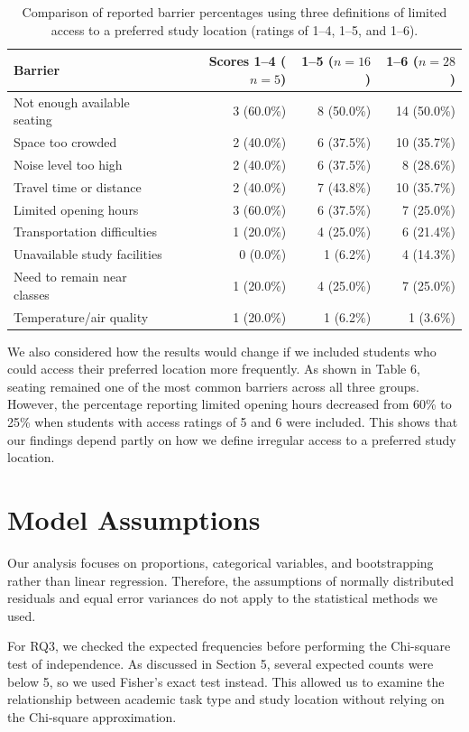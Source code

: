 \documentclass[11pt,letterpaper]{article}
\begin{document}
\begin{table}[H]\centering\small
\label{tab:sensitivity}
\begin{tabular}{@{}p{7cm}rrr@{}}\toprule
Barrier & Scores 1--4 ($n=5$) & 1--5 ($n=16$) & 1--6 ($n=28$)\\\midrule
Not enough available seating & 3 (60.0\%) & 8 (50.0\%) & 14 (50.0\%)\\
Space too crowded & 2 (40.0\%) & 6 (37.5\%) & 10 (35.7\%)\\
Noise level too high & 2 (40.0\%) & 6 (37.5\%) & 8 (28.6\%)\\
Travel time or distance & 2 (40.0\%) & 7 (43.8\%) & 10 (35.7\%)\\
Limited opening hours & 3 (60.0\%) & 6 (37.5\%) & 7 (25.0\%)\\
Transportation difficulties & 1 (20.0\%) & 4 (25.0\%) & 6 (21.4\%)\\
Unavailable study facilities & 0 (0.0\%) & 1 (6.2\%) & 4 (14.3\%)\\
Need to remain near classes & 1 (20.0\%) & 4 (25.0\%) & 7 (25.0\%)\\
Temperature/air quality & 1 (20.0\%) & 1 (6.2\%) & 1 (3.6\%)\\\bottomrule\end{tabular}
\caption{Comparison of reported barrier percentages using three definitions of limited access to a preferred study location (ratings of 1–4, 1–5, and 1–6).}
\end{table}

We also considered how the results would change if we included students who could access their preferred location more frequently. As shown in Table 6, seating remained one of the most common barriers across all three groups. However, the percentage reporting limited opening hours decreased from 60\% to 25\% when students with access ratings of 5 and 6 were included. This shows that our findings depend partly on how we define irregular access to a preferred study location.


\section{Model Assumptions}

Our analysis focuses on proportions, categorical variables, and bootstrapping rather than linear regression. Therefore, the assumptions of normally distributed residuals and equal error variances do not apply to the statistical methods we used.

For RQ3, we checked the expected frequencies before performing the Chi-square test of independence. As discussed in Section 5, several expected counts were below 5, so we used Fisher's exact test instead. This allowed us to examine the relationship between academic task type and study location without relying on the Chi-square approximation.
\end{document}
